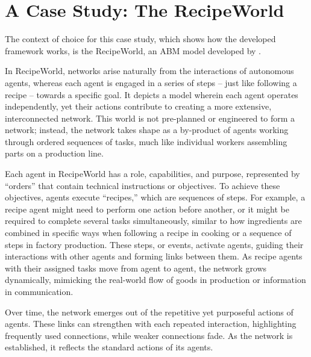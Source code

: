 \chapter{A Case Study: The RecipeWorld}\label{ch: case study}

The context of choice for this case study, which shows how the developed framework works, is the RecipeWorld, an \ac{ABM} model developed by \textcite{Fontana2015recipeWorld}.

In RecipeWorld,
%
networks arise naturally from the interactions of autonomous agents, whereas each agent is engaged in a series of steps -- just like following a recipe -- towards a specific goal. It depicts a model wherein each agent operates independently, yet their actions contribute to creating a more extensive, interconnected network. This world is not pre-planned or engineered to form a network; instead, the network takes shape as a by-product of agents working through ordered sequences of tasks, much like individual workers assembling parts on a production line.

Each agent in RecipeWorld has a role, capabilities, and purpose, represented by \enquote{orders} that contain technical instructions or objectives. To achieve these objectives, agents execute \enquote{recipes,} which are sequences of steps. For example, a recipe agent might need to perform one action before another, or it might be required to complete several tasks simultaneously, similar to how ingredients are combined in specific ways when following a recipe in cooking or a sequence of steps in factory production. These steps, or events, activate agents, guiding their interactions with other agents and forming links between them. As recipe agents with their assigned tasks move from agent to agent, the network grows dynamically, mimicking the real-world flow of goods in production or information in communication.

Over time, the network emerges out of the repetitive yet purposeful actions of agents. These links can strengthen with each repeated interaction, highlighting frequently used connections, while weaker connections fade. As the network is established, it reflects the standard actions of its agents. 


